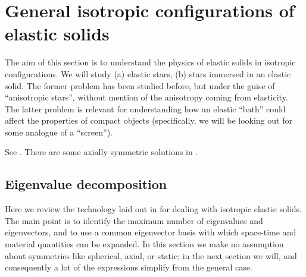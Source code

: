 \cleardoublepage
\section{General isotropic configurations of elastic solids}
The aim of this section is to understand the physics of elastic solids in isotropic configurations. We will study (a) elastic stars, (b) stars immersed in an elastic solid. The former problem has been studied before, but under the guise of ``anisotropic stars'', without mention of the anisotropy coming from elasticity. The latter problem is relevant for understanding how an elastic ``bath'' could affect the properties of compact objects (specifically, we will be looking out for some analogue of a ``screen''). 

See \cite{Frauendiener:2007yx}. There are some axially symmetric solutions in \cite{GRG_giulio_1993, Brito:2014hra, 1742-6596-314-1-012028, brito_thesis}.

\subsection{Eigenvalue decomposition}
Here we review the technology laid out in \cite{Karlovini:2002fc, Andersson:2006ze, Brito:2009jj} for dealing with isotropic elastic solids. The main point is to identify the maximum number of eigenvalues and eigenvectors, and to use a common eigenvector basis with which space-time and  material quantities can be expanded. In this section we make no assumption about symmetries like  spherical, axial, or static; in the next section we will, and consequently a lot of the expressions simplify from the general case.


